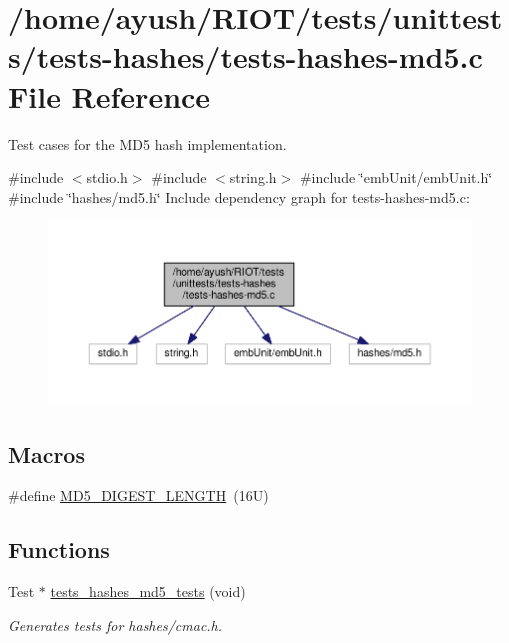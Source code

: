\hypertarget{tests-hashes-md5_8c}{}\section{/home/ayush/\+R\+I\+O\+T/tests/unittests/tests-\/hashes/tests-\/hashes-\/md5.c File Reference}
\label{tests-hashes-md5_8c}


Test cases for the M\+D5 hash implementation.  


{\ttfamily \#include $<$stdio.\+h$>$}\newline
{\ttfamily \#include $<$string.\+h$>$}\newline
{\ttfamily \#include \char`\"{}emb\+Unit/emb\+Unit.\+h\char`\"{}}\newline
{\ttfamily \#include \char`\"{}hashes/md5.\+h\char`\"{}}\newline
Include dependency graph for tests-\/hashes-\/md5.c\+:
\nopagebreak
\begin{figure}[H]
\begin{center}
\leavevmode
\includegraphics[width=350pt]{tests-hashes-md5_8c__incl}
\end{center}
\end{figure}
\subsection*{Macros}
\begin{DoxyCompactItemize}
\item 
\#define \hyperlink{tests-hashes-md5_8c_a09a4f4b2f28cbe522d9b80153666029c}{M\+D5\+\_\+\+D\+I\+G\+E\+S\+T\+\_\+\+L\+E\+N\+G\+TH}~(16\+U)
\end{DoxyCompactItemize}
\subsection*{Functions}
\begin{DoxyCompactItemize}
\item 
Test $\ast$ \hyperlink{group__unittests_ga256959a65e4f795eac3581259fb3e48a}{tests\+\_\+hashes\+\_\+md5\+\_\+tests} (void)
\begin{DoxyCompactList}\small\item\em Generates tests for hashes/cmac.\+h. \end{DoxyCompactList}\end{DoxyCompactItemize}


